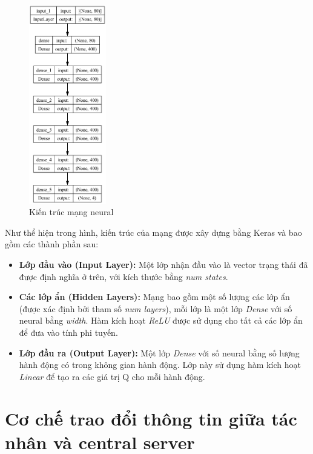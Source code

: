 \begin{figure}[!htp]
    \centering
    \includegraphics[width=0.3\textwidth]{img/model_structure}
    \caption{Kiến trúc mạng neural}
    \label{fig:model_structure}
\end{figure}

Như thể hiện trong hình, kiến trúc của mạng được xây dựng bằng Keras và bao gồm các thành phần sau:

\begin{itemize}
    \item \textbf{Lớp đầu vào (Input Layer):} Một lớp nhận đầu vào là vector trạng thái đã được định nghĩa ở trên, với kích thước bằng \textit{num states}.

    \item \textbf{Các lớp ẩn (Hidden Layers):} Mạng bao gồm một số lượng các lớp ẩn (được xác định bởi tham số \textit{num layers}), mỗi lớp là một lớp \textit{Dense} với số neural bằng \textit{width}. Hàm kích hoạt \textit{ReLU} được sử dụng cho tất cả các lớp ẩn để đưa vào tính phi tuyến.

    \item \textbf{Lớp đầu ra (Output Layer):} Một lớp \textit{Dense} với số neural bằng số lượng hành động có trong không gian hành động. Lớp này sử dụng hàm kích hoạt \textit{Linear} để tạo ra các giá trị Q cho mỗi hành động.
\end{itemize}

\section{Cơ chế trao đổi thông tin giữa tác nhân và central server}



